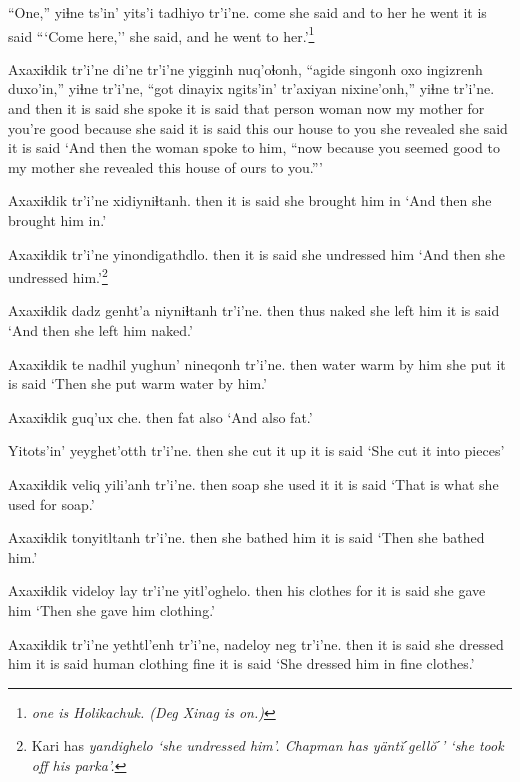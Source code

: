 \documentclass[12pt]{article}
\begin{document}
\gll ``One,'' yiɬne ts'in' yits'i tadhiyo tr'i'ne.
come {she said} and  {to her} {he went} {it is said}
\glt ```Come here,'' she said, and he went to her.'\footnote{\em one \em is Holikachuk. (Deg Xinag is \em on.)}
\glend

\gll Axaxiɬdik tr'i'ne di'ne tr'i'ne yigginh nuq'oɬonh, ``agide singonh oxo ingizrenh duxo'in,'' yiɬne  tr'i'ne, ``got dinayix ngits'in' {tr'axiyan nixine'onh,''}  yiɬne  tr'i'ne.
{and then} {it is said} {she spoke} {it is said} {that person} woman now  {my mother} for {you're good} because {she said} {it is said} this {our house} {to you} {she revealed} {she said} {it is said}
\glt `And then the woman spoke to him, ``now because you seemed good to my mother she revealed this house of ours to you.'''
\glend

\gll Axaxiɬdik tr'i'ne xidiyniɬtanh.
then  {it is said} {she brought him in}
\glt `And then she brought him in.'
\glend

\gll Axaxiɬdik tr'i'ne yinondigathdlo.
then  {it is said} {she undressed him}
\glt `And then she undressed him.'\footnote{Kari has \em yandighelo \em `she undressed him'. Chapman has \em y\"ant\u{i}ˊgell\u{o}ˊ' \em `she took off his parka'.}
\glend

\gll Axaxiɬdik dadz genht'a niyniɬtanh tr'i'ne.
then  thus naked  {she left him} {it is said}
\glt `And then she left him naked.'
\glend

\gll Axaxiɬdik te nadhil yughun' nineqonh tr'i'ne.
then  water warm  {by him} {she put}  {it is said}
\glt `Then she put warm water by him.'
\glend

\gll Axaxiɬdik guq'ux che.
then  fat  also
\glt `And also fat.'
\glend

\gll Yitots'in' yeyghet'otth tr'i'ne.
then  {she cut it up}  {it is said}
\glt `She cut it into pieces'
\glend

\gll Axaxiɬdik veliq yili'anh tr'i'ne.
then  soap  {she used it} {it is said}
\glt `That is what she used for soap.'
\glend

\gll Axaxiɬdik tonyitltanh  tr'i'ne.
then   {she bathed him} {it is said}
\glt `Then she bathed him.'
\glend

\gll Axaxiɬdik videloy lay tr'i'ne yitl'oghelo.
then {his clothes} for {it is said} {she gave him}
\glt `Then she gave him clothing.'
\glend

\gll Axaxiɬdik tr'i'ne yethtl'enh  tr'i'ne, nadeloy neg tr'i'ne.
then  {it is said} {she dressed him} {it is said} {human clothing} fine {it is said}
\glt `She dressed him in fine clothes.'
\glend
\end{document}
